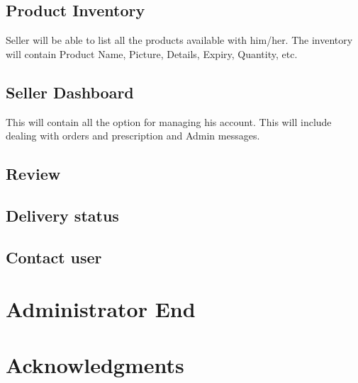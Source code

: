 \documentclass[fleqn,10pt]{SelfArx} %
\begin{document}
\subsection{Product Inventory}

Seller will be able to list all the products available with him/her. The inventory will contain Product Name, Picture, Details, Expiry, Quantity, etc.
\subsection{Seller Dashboard}

This will contain all the option for managing his account. This will include dealing with orders and prescription and Admin messages.
\subsection{Review}

\subsection{Delivery status}

\subsection{Contact user}

\section{Administrator End}

\section*{Acknowledgments} %


%
%

\end{document}
